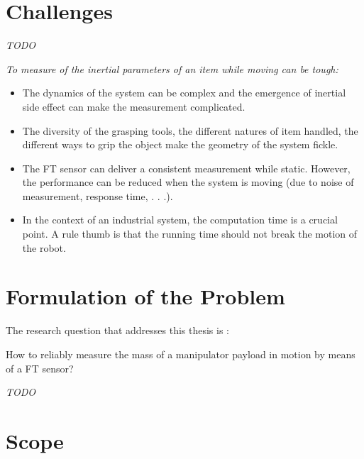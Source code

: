 \documentclass[/home/francois/latex/report/main.tex]{subfiles}
\begin{document}
\section{Challenges}

\textit{TODO}

{\it
To measure of the inertial parameters of an item while moving can be tough:

\begin{itemize}
	\item The dynamics of the system can be complex and the emergence of inertial side effect can make the measurement complicated.
	\item The diversity of the grasping tools, the different natures of item handled, the different ways to grip the object make the geometry of the system fickle.
	\item The \ac{FT} sensor can deliver a consistent measurement while static. However, the performance can be reduced when the system is moving (due to noise of measurement, response time, . . .).
	\item In the context of an industrial system, the computation time is a crucial point. A rule  thumb is that the running time should not break the motion of the robot.
\end{itemize}
}


\section{Formulation of the Problem}

The research question that addresses this thesis is :

How to reliably measure the mass of a manipulator payload in motion by means of a \ac{FT} sensor?

\textit{TODO}

\section{Scope}
\end{document}
